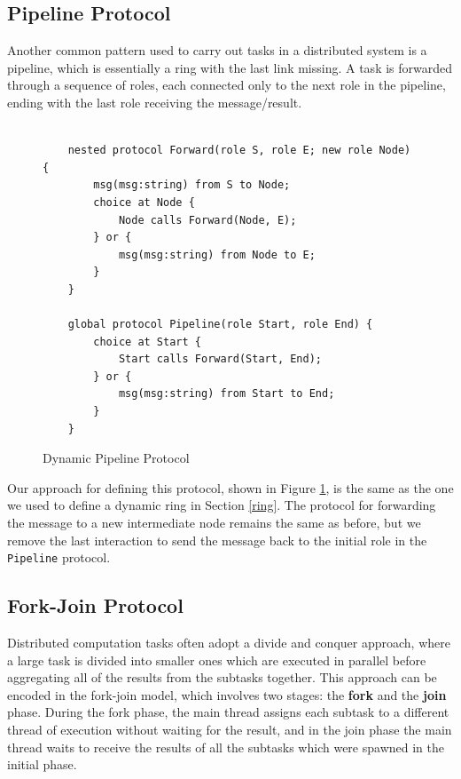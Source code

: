 \documentclass[12pt,twoside]{report}
\begin{document}
\subsection{Pipeline Protocol}\label{pipeline}

Another common pattern used to carry out tasks in a distributed system is a pipeline, which is essentially a ring with the last link missing. A task is forwarded through a sequence of roles, each connected only to the next role in the pipeline, ending with the last role receiving the message/result.

\begin{figure}[htb!]
    \centering
    \lstset{language=Scribble}
    \begin{lstlisting}
    
    nested protocol Forward(role S, role E; new role Node) {
        msg(msg:string) from S to Node;
        choice at Node {
            Node calls Forward(Node, E);
        } or {
            msg(msg:string) from Node to E;
        }
    }
        
    global protocol Pipeline(role Start, role End) {
        choice at Start {
            Start calls Forward(Start, End);
        } or {
            msg(msg:string) from Start to End;
        }
    }
    \end{lstlisting}
    \caption{Dynamic Pipeline Protocol}
    \label{pipeline-protocol}
\end{figure}{}


Our approach for defining this protocol, shown in Figure \ref{pipeline-protocol}, is the same as the one we used to define a dynamic ring in Section \ref{ring}. The protocol for forwarding the message to a new intermediate node remains the same as before, but we remove the last interaction to send the message back to the initial role in the \texttt{Pipeline} protocol.

\subsection{Fork-Join Protocol}\label{forkjoin}
Distributed computation tasks often adopt a divide and conquer approach, where a large task is divided into smaller ones which are executed in parallel before aggregating all of the results from the subtasks together. This approach can be encoded in the fork-join model, which involves two stages: the \textbf{fork} and the \textbf{join} phase. During the fork phase, the main thread assigns each subtask to a different thread of execution without waiting for the result, and in the join phase the main thread waits to receive the results of all the subtasks which were spawned in the initial phase.\\
\end{document}
